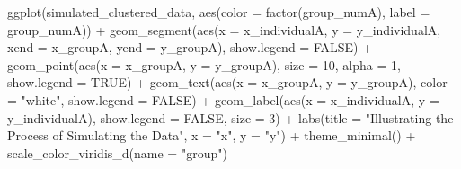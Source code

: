 \documentclass[
  letterpaper,
  DIV=11,
  numbers=noendperiod]{scrreprt}
\newenvironment{Shaded}{\begin{snugshade}}{\end{snugshade}}
\newcommand{\AttributeTok}[1]{\textcolor[rgb]{0.40,0.45,0.13}{#1}}
\newcommand{\ConstantTok}[1]{\textcolor[rgb]{0.56,0.35,0.01}{#1}}
\newcommand{\DecValTok}[1]{\textcolor[rgb]{0.68,0.00,0.00}{#1}}
\newcommand{\FunctionTok}[1]{\textcolor[rgb]{0.28,0.35,0.67}{#1}}
\newcommand{\NormalTok}[1]{\textcolor[rgb]{0.00,0.23,0.31}{#1}}
\newcommand{\SpecialCharTok}[1]{\textcolor[rgb]{0.37,0.37,0.37}{#1}}
\newcommand{\StringTok}[1]{\textcolor[rgb]{0.13,0.47,0.30}{#1}}
\begin{document}
\begin{Shaded}
\begin{Highlighting}[]
\FunctionTok{ggplot}\NormalTok{(simulated\_clustered\_data,}
       \FunctionTok{aes}\NormalTok{(}\AttributeTok{color =} \FunctionTok{factor}\NormalTok{(group\_numA),}
           \AttributeTok{label =}\NormalTok{ group\_numA)) }\SpecialCharTok{+}
  \FunctionTok{geom\_segment}\NormalTok{(}\FunctionTok{aes}\NormalTok{(}\AttributeTok{x =}\NormalTok{ x\_individualA, }
                \AttributeTok{y =}\NormalTok{ y\_individualA,}
                \AttributeTok{xend =}\NormalTok{ x\_groupA,}
                \AttributeTok{yend =}\NormalTok{ y\_groupA),}
               \AttributeTok{show.legend =} \ConstantTok{FALSE}\NormalTok{) }\SpecialCharTok{+}
  \FunctionTok{geom\_point}\NormalTok{(}\FunctionTok{aes}\NormalTok{(}\AttributeTok{x =}\NormalTok{ x\_groupA, }
                 \AttributeTok{y =}\NormalTok{ y\_groupA),}
             \AttributeTok{size =} \DecValTok{10}\NormalTok{,}
             \AttributeTok{alpha =} \DecValTok{1}\NormalTok{,}
             \AttributeTok{show.legend =} \ConstantTok{TRUE}\NormalTok{) }\SpecialCharTok{+} 
  \FunctionTok{geom\_text}\NormalTok{(}\FunctionTok{aes}\NormalTok{(}\AttributeTok{x =}\NormalTok{ x\_groupA,}
                \AttributeTok{y =}\NormalTok{ y\_groupA),}
            \AttributeTok{color =} \StringTok{"white"}\NormalTok{,}
            \AttributeTok{show.legend =} \ConstantTok{FALSE}\NormalTok{) }\SpecialCharTok{+}
  \FunctionTok{geom\_label}\NormalTok{(}\FunctionTok{aes}\NormalTok{(}\AttributeTok{x =}\NormalTok{ x\_individualA, }
                \AttributeTok{y =}\NormalTok{ y\_individualA),}
             \AttributeTok{show.legend =} \ConstantTok{FALSE}\NormalTok{,}
             \AttributeTok{size =} \DecValTok{3}\NormalTok{) }\SpecialCharTok{+} 
  \FunctionTok{labs}\NormalTok{(}\AttributeTok{title =} \StringTok{"Illustrating the Process of Simulating the Data"}\NormalTok{,}
       \AttributeTok{x =} \StringTok{"x"}\NormalTok{,}
       \AttributeTok{y =} \StringTok{"y"}\NormalTok{) }\SpecialCharTok{+}
  \FunctionTok{theme\_minimal}\NormalTok{() }\SpecialCharTok{+}
  \FunctionTok{scale\_color\_viridis\_d}\NormalTok{(}\AttributeTok{name =} \StringTok{"group"}\NormalTok{)}
\end{Highlighting}
\end{Shaded}
\end{document}
